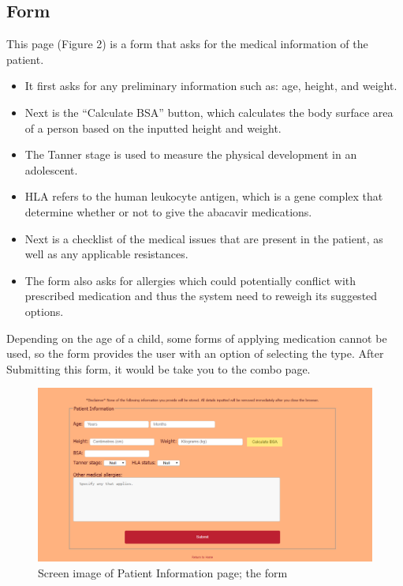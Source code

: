 \documentclass[12pt]{article}
\begin{document}
\subsection{Form}
This page (Figure 2) is a form that asks for the medical information of the patient. 
\begin{itemize}
	\item It first asks for any preliminary information such as: age, height, and weight.
	\item Next is the “Calculate BSA” button, which calculates the body surface area of a person based on the inputted height and weight.
	\item  The Tanner stage is used to measure the physical development in an adolescent.
    \item HLA refers to the human leukocyte antigen, which is a gene complex that determine whether or not to give the abacavir medications. 
    \item  Next is a checklist of the medical issues that are present in the patient, as well as any applicable resistances.
    \item The form also asks for allergies which could potentially conflict with prescribed medication and thus the system need to reweigh its suggested options.
\end{itemize}
  Depending on the age of a child, some forms of applying medication cannot be used, so the form provides the user with an option of selecting the type. After Submitting this form, it would be take you to the combo page.

\begin{figure}[H]
  \centering
  \includegraphics[width=\linewidth]{form1.png}
  \caption{Screen image of Patient Information page; the form}
  \label{fig:form1}
\end{figure}
\end{document}
